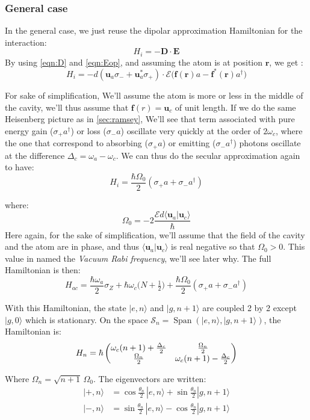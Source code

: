 \documentclass[10pt]{report}
\theoremstyle{plain}
\theoremstyle{definition}
\theoremstyle{remark}
\newcommand{\ket}[1]{|#1\rangle}
\newcommand{\braket}[2]{\langle#1|#2\rangle}
\newcommand{\mat}[1]{\begin{pmatrix}#1\end{pmatrix}}
\newcommand{\bs}{\boldsymbol}
\DeclareMathOperator{\Span}{Span}
\newcommand{\twoline}{\vphantom{\frac\int\int}}
\begin{document}
\subsubsection{General case}

In the general case, we just reuse the dipolar approximation Hamiltonian for the
interaction:
\[H_i = - \bs D \cdot \bs E\]
By using \cref{eqn:D} and \cref{eqn:Eop}, and assuming the atom is at
position $\bs r$, we get :
\[H_i = - d(\bs u_a \sigma_- + \bs u_a^* \sigma_+) \cdot \mathcal{E}\big(\bs
  f(\bs r) a - \bs f^*(\bs r)
  a^\dagger \big)
  \]


For sake of simplification, We'll assume the atom is more or less in the middle
of the cavity, we'll thus assume that $\bs f(r) = \bs u_c$ of unit length.
If we do the same Heisenberg picture as in \cref{sec:ramsey}, We'll see that
term associated with pure energy gain ($\sigma_+a^\dagger$) or loss ($\sigma_-a$)
oscillate very quickly at the order of $2\omega_c$,
where the one that correspond to absorbing ($\sigma_+a$) or emitting
($\sigma_-a^\dagger$) photons oscillate at the difference $\Delta_c = \omega_a -
\omega_c$. We can
thus do the secular approximation again to have:
\begin{equation}
  H_i = \frac{\hbar \Omega_0}2 (\sigma_+a + \sigma_-a^\dagger)
\end{equation}

where:
\[\Omega_0 = -2\frac {\mathcal{E}d \braket{\bs u_a}{\bs u_c}}{\hbar}\]
Here again, for the sake of simplification, we'll assume that the field of the
cavity and the atom are in phase, and thus $\braket{\bs u_a}{\bs u_c}$ is real
negative so that $\Omega_0 > 0$. This value in named the \emph{Vacuum Rabi
  frequency}, we'll see later why. The full Hamiltonian is then:
\begin{equation}
H_{ac} = \frac{\hbar \omega_a}2 \sigma_Z + \hbar \omega_c \big(N +
  \tfrac12\big) + \frac{\hbar \Omega_0}2 (\sigma_+a + \sigma_-a^\dagger)
\end{equation}

With this Hamiltonian, the state $\ket{e,n}$ and $\ket{g,n+1}$ are coupled 2 by
2 except $\ket{g,0}$ which is stationary. On the space $\mathcal{S}_n =
\Span(\ket{e,n},\ket{g,n+1})$, the Hamiltonian is:
\[\twoline H_n = \hbar \mat{\omega_c(n+1) + \frac{\Delta_c}2& \frac{\Omega_n}2\\
    \frac{\Omega_n}2&\omega_c(n+1) - \frac{\Delta_c}2}\]

Where $\Omega_n = \sqrt{n+1} \,\Omega_0$. The eigenvectors are written:
\newcommand{\tnt}{\frac{\theta_n}2}
\begin{align*}
  \ket{+,n} &= \cos \tnt \,\ket{e,n} + \sin \tnt \ket{g,n+1}\\
  \ket{-,n} &= \sin \tnt \,\ket{e,n} - \cos \tnt \ket{g,n+1}\\
\end{align*}
\end{document}
